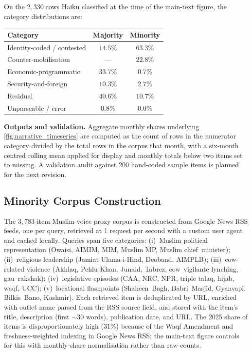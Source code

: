 On the $2{,}330$ rows Haiku classified at the time of the main-text figure,
the category distributions are:
\begin{center}
\footnotesize
\begin{tabular}{lcc}
\toprule
Category & Majority & Minority \\
\midrule
Identity-coded / contested & $14.5\%$ & $63.3\%$ \\
Counter-mobilisation & --- & $22.8\%$ \\
Economic-programmatic & $33.7\%$ & $0.7\%$ \\
Security-and-foreign & $10.3\%$ & $2.7\%$ \\
Residual & $40.6\%$ & $10.7\%$ \\
Unparseable / error & $0.8\%$ & $0.0\%$ \\
\bottomrule
\end{tabular}
\end{center}

\textbf{Outputs and validation.} Aggregate monthly shares
underlying \autoref{fig:narrative_timeseries} are computed as the count of
rows in the numerator category divided by the total rows in the corpus that
month, with a six-month centred rolling mean applied for display and
monthly totals below two items set to missing. A validation audit against
$200$ hand-coded sample items is planned for the next revision.

\subsection{Minority Corpus Construction} \label{app:minority_corpus}

The $3{,}783$-item Muslim-voice proxy corpus is constructed from Google News
RSS feeds, one per query, retrieved at 1 request per second with a custom
user agent and cached locally. Queries span five categories: (i)~Muslim
political representation (Owaisi, AIMIM, MIM, Muslim MP, Muslim
chief~minister); (ii)~religious leadership (Jamiat Ulama-i-Hind, Deoband,
AIMPLB); (iii)~cow-related violence (Akhlaq, Pehlu Khan, Junaid, Tabrez,
cow~vigilante lynching, gau~rakshak); (iv)~legislative episodes (CAA,
NRC, NPR, triple talaq, hijab, waqf, UCC); (v)~locational flashpoints
(Shaheen~Bagh, Babri~Masjid, Gyanvapi, Bilkis~Bano, Kashmir). Each retrieved
item is deduplicated by URL, enriched with outlet name parsed from the RSS
source field, and stored with the item's title, description (first $\sim$30
words), publication date, and URL. The 2025 share of items is
disproportionately high ($31\%$) because of the Waqf Amendment and
freshness-weighted indexing in Google News RSS; the main-text figure
controls for this with monthly-share normalisation rather than raw counts.

